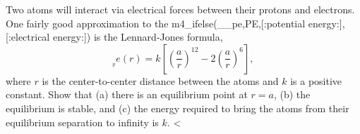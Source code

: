 Two atoms will interact via electrical forces between
their protons and electrons. One fairly good approximation
to the m4_ifelse(__pe,PE,[:potential energy:],[:electrical energy:]) is the Lennard-Jones formula,
\begin{equation*}
   __pe (r) = k\left[\left(\frac{a}{r}\right)^{12}-2\left(\frac{a}{r}\right)^{6}\right],
\end{equation*}
where $r$ is the center-to-center distance between the atoms and $k$ is a positive constant.
Show that (a) there is an equilibrium point at $r=a$,\hwendpart
(b) the equilibrium is stable, and\hwendpart
(c) the energy required to bring
the atoms from their equilibrium separation to infinity is
$k$. <%
